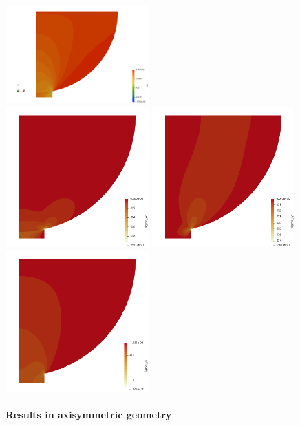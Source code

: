 \begin{center}
\includegraphics[width=5.5cm]{python_codes/fieldstone_63/results/eyy}\\
\includegraphics[width=5.5cm]{python_codes/fieldstone_63/results/sigma_xx}
\includegraphics[width=5.5cm]{python_codes/fieldstone_63/results/sigma_xy}
\includegraphics[width=5.5cm]{python_codes/fieldstone_63/results/sigma_yy}
\end{center}

\newpage
\paragraph{Results in axisymmetric geometry}



